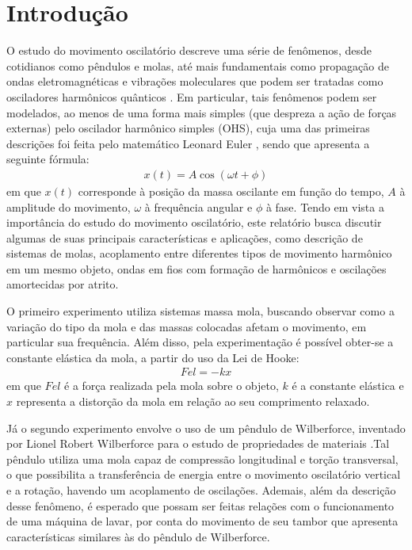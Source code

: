 \section{Introdução}
O estudo do movimento oscilatório descreve uma série de fenômenos, desde cotidianos como pêndulos e molas, até mais fundamentais como propagação de ondas eletromagnéticas e vibrações moleculares que podem ser tratadas como osciladores harmônicos quânticos \cite{libretexts76Quantum}. Em particular, tais fenômenos podem ser modelados, ao menos de uma forma mais simples (que despreza a ação de forças externas) pelo oscilador harmônico simples (OHS), cuja uma das primeiras descrições foi feita pelo matemático Leonard Euler \cite{barros2023oscilador}, sendo que apresenta a seguinte fórmula:
\begin{align*}
	x(t) = A \cos{(\omega t + \phi)}
\end{align*}
em que \(x(t)\) corresponde à posição da massa oscilante em função do tempo, \(A\) à amplitude do movimento, \(\omega\) à frequência angular e \(\phi\) à fase.
Tendo em vista a importância do estudo do movimento oscilatório, este relatório busca discutir algumas de suas principais características e aplicações, como descrição de sistemas de molas, acoplamento entre diferentes tipos de movimento harmônico em um mesmo objeto, ondas em fios com formação de harmônicos e oscilações amortecidas por atrito.

O primeiro experimento utiliza sistemas massa mola, buscando observar como a variação do tipo da mola e das massas colocadas afetam o movimento, em particular sua frequência. Além disso, pela experimentação é possível obter-se a constante elástica da mola, a partir do uso da Lei de Hooke:
\begin{align*}
	Fel = -kx
\end{align*}
em que \(Fel\) é a força realizada pela mola sobre o objeto, \(k\) é a constante elástica e \(x\) representa a distorção da mola em relação ao seu comprimento relaxado.

Já o segundo experimento envolve o uso de um pêndulo de Wilberforce, inventado por Lionel Robert Wilberforce para o estudo de propriedades de materiais \cite{wilberforceRef}.Tal pêndulo utiliza uma mola capaz de compressão longitudinal e torção transversal, o que possibilita a transferência de energia entre o movimento oscilatório vertical e a rotação, havendo um acoplamento de oscilações. Ademais, além da descrição desse fenômeno, é esperado que possam ser feitas relações com o funcionamento de uma máquina de lavar, por conta do movimento de seu tambor que apresenta características similares às do pêndulo de Wilberforce.

